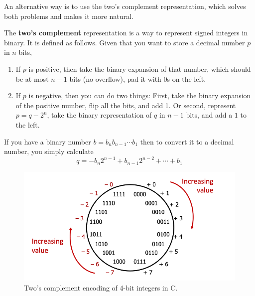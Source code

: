 \documentclass{article}
\begin{document}
    An alternative way is to use the two's complement representation, which solves both problems and makes it more natural. 

    \begin{theorem}
      The \textbf{two's complement} representation is a way to represent signed integers in binary. It is defined as follows. Given that you want to store a decimal number $p$ in $n$ bits, 

      \begin{enumerate}
        \item If $p$ is positive, then take the binary expansion of that number, which should be at most $n-1$ bits (no overflow), pad it with $0$s on the left. 
        \item If $p$ is negative, then you can do two things: First, take the binary expansion of the positive number, flip all the bits, and add 1. Or second, represent $p = q - 2^n$, take the binary representation of $q$ in $n-1$ bits, and add a $1$ to the left. 
      \end{enumerate}
      If you have a binary number $b = b_{n}b_{n-1}\cdots b_1$ then to convert it to a decimal number, you simply calculate 
      \begin{equation}
        q = -b_{n}2^{n-1} + b_{n-1}2^{n-2} + \cdots + b_1
      \end{equation}
      \begin{figure}[H]
        \centering 
        \includegraphics[scale=0.4]{img/twos_complement_encoding.png}
        \caption{Two's complement encoding of 4-bit integers in C.} 
        \label{fig:twos_complement_encoding}
      \end{figure}
    \end{theorem}
\end{document}
